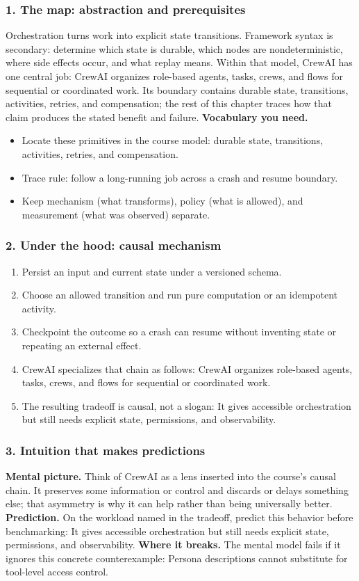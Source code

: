 \subsubsection*{1. The map: abstraction and prerequisites}
Orchestration turns work into explicit state transitions. Framework syntax is secondary: determine which state is durable, which nodes are nondeterministic, where side effects occur, and what replay means.
Within that model, CrewAI has one central job: CrewAI organizes role-based agents, tasks, crews, and flows for sequential or coordinated work. Its boundary contains durable state, transitions, activities, retries, and compensation; the rest of this chapter traces how that claim produces the stated benefit and failure.
\textbf{Vocabulary you need.}\begin{itemize}
\item Locate these primitives in the course model: durable state, transitions, activities, retries, and compensation.
\item Trace rule: follow a long-running job across a crash and resume boundary.
\item Keep mechanism (what transforms), policy (what is allowed), and measurement (what was observed) separate.
\end{itemize}
\subsubsection*{2. Under the hood: causal mechanism}\begin{enumerate}
\item Persist an input and current state under a versioned schema.
\item Choose an allowed transition and run pure computation or an idempotent activity.
\item Checkpoint the outcome so a crash can resume without inventing state or repeating an external effect.
\item CrewAI specializes that chain as follows: CrewAI organizes role-based agents, tasks, crews, and flows for sequential or coordinated work.
\item The resulting tradeoff is causal, not a slogan: It gives accessible orchestration but still needs explicit state, permissions, and observability.
\end{enumerate}
\subsubsection*{3. Intuition that makes predictions}
\textbf{Mental picture.} Think of CrewAI as a lens inserted into the course's causal chain. It preserves some information or control and discards or delays something else; that asymmetry is why it can help rather than being universally better.
\textbf{Prediction.} On the workload named in the tradeoff, predict this behavior before benchmarking: It gives accessible orchestration but still needs explicit state, permissions, and observability.
\textbf{Where it breaks.} The mental model fails if it ignores this concrete counterexample: Persona descriptions cannot substitute for tool-level access control.
